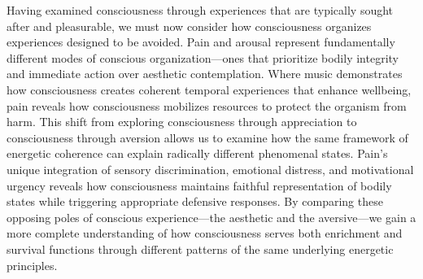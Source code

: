 Having examined consciousness through experiences that are typically sought after and pleasurable, we must now consider how consciousness organizes experiences designed to be avoided. Pain and arousal represent fundamentally different modes of conscious organization—ones that prioritize bodily integrity and immediate action over aesthetic contemplation. Where music demonstrates how consciousness creates coherent temporal experiences that enhance wellbeing, pain reveals how consciousness mobilizes resources to protect the organism from harm. This shift from exploring consciousness through appreciation to consciousness through aversion allows us to examine how the same framework of energetic coherence can explain radically different phenomenal states. Pain's unique integration of sensory discrimination, emotional distress, and motivational urgency reveals how consciousness maintains faithful representation of bodily states while triggering appropriate defensive responses. By comparing these opposing poles of conscious experience—the aesthetic and the aversive—we gain a more complete understanding of how consciousness serves both enrichment and survival functions through different patterns of the same underlying energetic principles.
